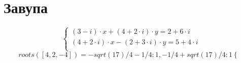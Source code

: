 \documentclass[a4paper, fontsize=10bp]{article} %
\begin{document}
\section{Завупа}
\begin{equation*}
   \begin{cases}
        (3-i)\cdot x +(4+2\cdot i)\cdot y=2+6\cdot i\\
        (4+2\cdot i)\cdot x -(2+3\cdot i)\cdot y=5+4\cdot i\\
    \end{cases}
\end{equation*}
\bigskip
\begin{equation*}
    roots([4, 2, -4]) = {-sqrt(17)/4 - 1/4: 1, -1/4 + sqrt(17)/4: 1}
\begin{cases}
       
    \end{cases}
\end{equation*}
\end{document}

